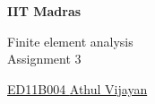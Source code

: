 \documentclass[11pt,paper=a4,answers]{exam}
\begin{document}
\noindent
\begin{minipage}[l]{.1\textwidth}%
\noindent
\end{minipage}
\hfill
\begin{minipage}[r]{.68\textwidth}%
\begin{center}
{\large \bfseries IIT Madras \par
\Large Finite element analysis \\[2pt]
\small Assignment 3  \par}
\end{center}
\end{minipage}
\par
\noindent
\uline{ED11B004   \hfill \normalsize\emph \hfill       Athul Vijayan}
\end{document}

